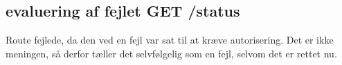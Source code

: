 \documentclass{report}
\begin{document}
\subsection{evaluering af fejlet GET /status}
Route fejlede, da den ved en fejl var sat til at kræve autorisering. Det er ikke meningen, så derfor tæller det selvfølgelig som en fejl, selvom det er rettet nu.

\clearpage

\appendix
\renewcommand{\thechapter}{\Alph{chapter}}

	
\end{document}
